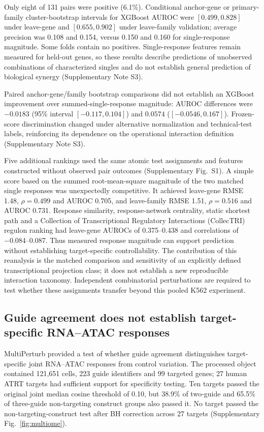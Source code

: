 \documentclass[a4paper,fleqn]{cas-sc}
\makeatletter
\DeclareRobustCommand{\rev}[1]{{\color{red}\def\@citecolor{black}\def\@linkcolor{red}\def\@urlcolor{red}#1}}
\makeatother
\begin{document}
Only eight of 131 pairs were positive (6.1\%). Conditional anchor-gene or primary-family cluster-bootstrap intervals for XGBoost AUROC were $[0.499,0.828]$ under leave-gene and $[0.655,0.902]$ under leave-family validation; average precision was 0.108 and 0.154, versus 0.150 and 0.160 for single-response magnitude. Some folds contain no positives. Single-response features remain measured for held-out genes, so these results describe predictions of unobserved combinations of characterized singles and do not establish general prediction of biological synergy (Supplementary Note S3).

Paired anchor-gene/family bootstrap comparisons did not establish an XGBoost improvement over summed-single-response magnitude: AUROC differences were $-0.0183$ (95\% interval $[-0.117,0.104]$) and $0.0574$ ($[-0.0546,0.167]$). Frozen-score discrimination changed under alternative normalization and technical-test labels, reinforcing its dependence on the operational interaction definition (Supplementary Note S3).

Five additional rankings used the same atomic test assignments and features constructed without observed pair outcomes (Supplementary Fig.~S1). A simple score based on the summed root-mean-square magnitude of the two matched single responses was unexpectedly competitive. It achieved leave-gene RMSE 1.48, $\rho=0.499$ and AUROC 0.705, and leave-family RMSE 1.51, $\rho=0.516$ and AUROC 0.731. Response similarity, response-network centrality, static shortest path and a Collection of Transcriptional Regulatory Interactions (CollecTRI) regulon ranking had leave-gene AUROCs of 0.375--0.438 and correlations of $-0.084$--0.087. Thus measured response magnitude can support prediction without establishing target-specific controllability. \rev{The contribution of this reanalysis is the matched comparison and sensitivity of an explicitly defined transcriptional projection class; it does not establish a new reproducible interaction taxonomy.} \rev{Independent combinatorial perturbations are required to test whether these assignments transfer beyond this pooled K562 experiment.}


\subsection*{\rev{Guide agreement does not establish target-specific RNA--ATAC responses}}

\rev{MultiPerturb provided a test of whether guide agreement distinguishes target-specific joint RNA--ATAC responses from control variation.} \rev{The processed object contained 121,651 cells, 223 guide identifiers and 99 targeted genes; 27 human ATRT targets had sufficient support for specificity testing.} \rev{Ten targets passed the original joint median cosine threshold of 0.10, but 38.9\% of two-guide and 65.5\% of three-guide non-targeting construct groups also passed it.} \rev{No target passed the non-targeting-construct test after BH correction across 27 targets (Supplementary Fig.~\ref{fig:multiome}).}
\end{document}
